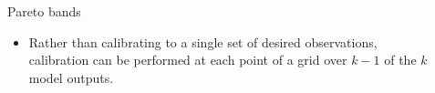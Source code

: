 \documentclass[final]{beamer}
\newlength{\sepwid}
\newlength{\onecolwid}
\newlength{\twocolwid}
\begin{document}
\begin{frame}[t]
\begin{columns}[t]
\begin{column}{\twocolwid}
\begin{columns}[t,totalwidth=\twocolwid]
\begin{column}{\onecolwid}
%
%
%
%
%


\end{column} %

\end{columns} %

\end{column} %

\begin{column}{\sepwid}\end{column} %

\begin{column}{\onecolwid} %


\begin{alertblock}{Pareto bands}

\begin{itemize}

\item Rather than calibrating to a single set of desired observations, calibration can be performed at each point of a grid over $k-1$ of the $k$ model outputs.


\end{itemize}
\end{alertblock}
\end{column}
\end{columns}
\end{frame}
\end{document}
